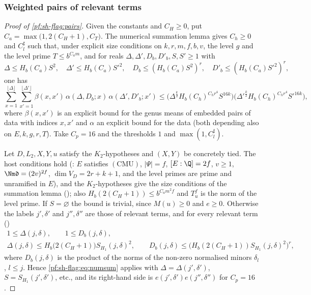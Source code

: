 \subsubsection{Weighted pairs of relevant terms}

\begin{proof}[Proof of \cref{pf:sh-flag:pairs}]
Given the constants and $C_H\ge0$, put $C_a=\max\bigl(1,2(C_H+1),C_T\bigr)$. The numerical summation lemma
 gives $C_h\ge0$ and $C_{l}^\sharp$ such that, under explicit size conditions
on $k,r,m,f,b,v$, the level $g$ and the level prime $T\le b^{C_am}$, and for reals $\Delta,\Delta',D_b,D'_b,S,S'\ge1$ with
\[
\Delta\le H_b(C_a)S^2,\quad\Delta'\le H_b(C_a)S'^2,\quad D_b\le(H_b(C_a)S^2)^r,\quad D'_b\le(H_b(C_a)S'^2)^r,
\]
one has
\begin{equation}\label{pf:sh-flag:eq:numsum}
\sum_{x=1}^{\lfloor\Delta\rfloor}\sum_{x'=1}^{\lfloor\Delta'\rfloor}\beta(x,x')\,\alpha(\Delta,D_b;x)\,\alpha(\Delta',D'_b;x')\le
\bigl(\Delta^{\frac k2}H_b(C_h)^{C_hr^4}S^{16k}\bigr)\bigl(\Delta'^{\frac k2}H_b(C_h)^{C_hr^4}S'^{16k}\bigr),
\end{equation}
where $\beta(x,x')$ is an explicit bound for the genus means of embedded pairs of data with indices $x,x'$ and $\alpha$ an explicit
bound for the data (both depending also on $E,k,g,r,T$). Take $C_p=16$ and the thresholds $1$ and $\max(1,C_l^\sharp)$.

Let $D,L_2,X,Y,u$ satisfy the $K_2$-hypotheses and $(X,Y)$ be concretely tied. The host conditions hold
(: $E$ satisfies $(\mathrm{CMU})$, $|\Psi|=f$, $[E:\Q]=2f$, $v\ge1$,
$\Nm\mathfrak d=(2v)^{2f}$, $\dim V_D=2r+k+1$, and the level primes are prime and unramified in $E$), and the $K_2$-hypotheses give
the size conditions of the summation lemma (); also
$H_b(2(C_H+1))\le b^{C_am^2f}$ and $T_u^f$ is the norm of the level prime. If $S=\varnothing$ the bound is trivial, since $M(u)\ge0$ and
$e\ge0$. Otherwise the labels $j',\delta'$ and $j'',\delta''$ are those of relevant terms, and for every relevant term
()
\begin{gather*}
1\le\Delta(j,\delta),\qquad 1\le D_b(j,\delta),\\
\Delta(j,\delta)\le H_b\bigl(2(C_H+1)\bigr)S_{H_1}(j,\delta)^2,\qquad
D_b(j,\delta)\le\bigl(H_b(2(C_H+1))S_{H_1}(j,\delta)^2\bigr)^r,
\end{gather*}
where $D_b(j,\delta)$ is the product of the norms of the non-zero normalised minors $\delta_l$, $l\le j$. Hence
\eqref{pf:sh-flag:eq:numsum} applies with $\Delta=\Delta(j',\delta')$, $S=S_{H_1}(j',\delta')$, etc., and its right-hand side is
$e(j',\delta')e(j'',\delta'')$ for $C_p=16$.


\end{proof}
